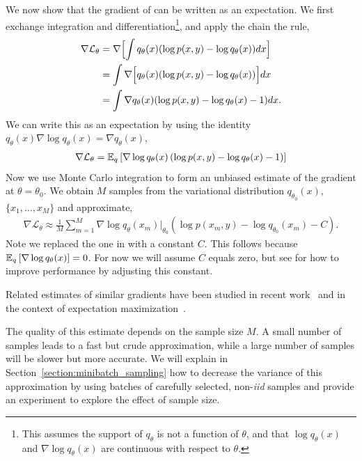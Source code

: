 We now show that the gradient of
 can be written
as an expectation.  We first exchange integration and
differentiation\footnote{This assumes the support of $q_\theta$ is not
  a function of $\theta$, and that $\log q_\theta(x)$ and $\nabla \log
  q_\theta(x)$ are continuous with respect to $\theta$.}, and apply
the chain the rule,
\begin{align}
 \nabla \mathcal{L}_\theta &= \nabla \Bigl[
  \int q_{\theta}(x) (\log p(x, y) - \log q_{\theta}(x))
  dx \Bigr] \\ \nonumber
  & = \int \nabla \Bigl[ q_{\theta}(x) (\log p(x, y) - \log
     q_{\theta}(x)) \Bigr] dx  \\ \nonumber
     &= \int \nabla q_{\theta}(x) (
     \log p(x, y) - \log q_{\theta}(x) - 1) dx.
\end{align}
We can write this as an expectation by using the identity
$q_\theta(x) \nabla \log q_\theta(x) = \nabla q_\theta(x)$,
\begin{align}
  \label{eq:gradient-as-expectation}
  \nabla \mathcal{L}_\theta =
  \mathbb{E}_q\left[\nabla \log q_\theta(x) \left(\log p(x,y) - \log
      q_{\theta}(x) - 1 \right)\right]
\end{align}
Now we use Monte Carlo integration to form an unbiased estimate of the
gradient at $\theta = \theta_0$.  We obtain $M$ samples from the
variational distribution $q_{\theta_0}(x)$, $\{x_{1}, \ldots, x_{M}\}$
and approximate,
\begin{align}
  \label{eq:svo_gradient}
  \nabla \mathcal{L}_\theta \approx \frac{1}{M} \sum_{m=1}^M
  \nabla \log q_{\theta}(x_{m}) \Bigr|_{\theta_0}
  (\log p(x_{m} , y) - \log q_{\theta_0}(x_{m}) - C).
\end{align}
Note we replaced the one in  with a
constant $C$.  This follows because $\mathbb{E}_q\left[\nabla \log q_\theta(x)\right]
= 0$.  For now we will assume $C$ equals zero, but see
 for how to improve performance by adjusting this
constant.

Related estimates of similar gradients have been studied in
recent work~\cite{carbonetto:2009,graves:2011} and in the context of
expectation maximization~\cite{wei:1990}.

The quality of this estimate depends on the sample size $M$.  A small
number of samples leads to a fast but crude approximation, while a
large number of samples will be slower but more accurate.  We will
explain in Section~\ref{section:minibatch_sampling} how to decrease
the variance of this approximation by using batches of carefully
selected, non-\emph{iid} samples and provide an experiment to explore
the effect of sample size.


